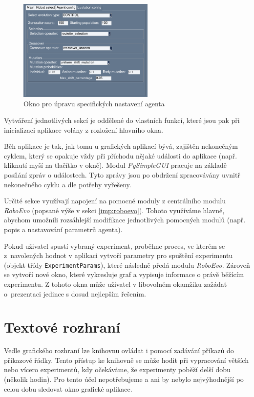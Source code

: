\begin{figure}[!htb]
    \centering
    \includegraphics[width=0.6\textwidth]{../img/GUI_evo_tab.jpg}
    \caption{Okno pro úpravu specifických nastavení agenta}
    \label{imp:fig:GUI_evo}
\end{figure}


Vytváření jednotlivých sekcí je oddělené do vlastních funkcí, které jsou pak
při inicializaci aplikace volány z rozložení hlavního okna.

Běh aplikace je tak, jak tomu u grafických aplikací bývá, zajištěn nekonečným
cyklem, který se opakuje vždy při příchodu nějaké události do aplikace (např.
kliknutí myší na tlačítko v okně). Modul \emph{PySimpleGUI} pracuje na základě
posílání zpráv o událostech. Tyto zprávy jsou po obdržení zpracovávány uvnitř
nekonečného cyklu a dle potřeby vyřešeny.

Určité sekce využívají napojení na pomocné moduly z centrálního modulu
\emph{RoboEvo} (popsané výše v sekci \ref{imp:roboevo}). Tohoto využíváme
hlavně, abychom umožnili rozsáhlejší modifikace jednotlivých pomocných modulů
(např. popis a nastavování parametrů agenta).

Pokud uživatel spustí vybraný experiment, proběhne proces, ve kterém se
z~navolených hodnot v aplikaci vytvoří parametry pro spuštění experimentu
(objekt třídy \texttt{ExperimentParams}), které následně předá modulu
\emph{RoboEvo}. Zároveň se vytvoří nové okno, které vykresluje graf a vypisuje
informace o právě běžícím experimentu. Z tohoto okna může uživatel v libovolném
okamžiku zažádat o~prezentaci jedince s dosud nejlepším řešením.

\section{Textové rozhraní} \label{imp:TUI}
Vedle grafického rozhraní lze knihovnu ovládat i pomocí zadávání příkazů do
příkazové řádky. Tento přístup ke knihovně se může hodit při vypracování
větších nebo vícero experimentů, kdy očekáváme, že experimenty poběží delší
dobu (několik hodin). Pro tento účel nepotřebujeme a ani by nebylo
nejvýhodnější po celou dobu sledovat okno grafické aplikace.

